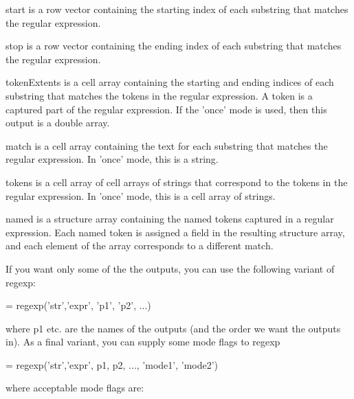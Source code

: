 \begin{DoxyItemize}
\item {\ttfamily start} is a row vector containing the starting index of each substring that matches the regular expression.  
\item {\ttfamily stop} is a row vector containing the ending index of each substring that matches the regular expression.  
\item {\ttfamily token\-Extents} is a cell array containing the starting and ending indices of each substring that matches the {\ttfamily tokens} in the regular expression. A token is a captured part of the regular expression. If the {\ttfamily 'once'} mode is used, then this output is a {\ttfamily double} array.  
\item {\ttfamily match} is a cell array containing the text for each substring that matches the regular expression. In {\ttfamily 'once'} mode, this is a string.  
\item {\ttfamily tokens} is a cell array of cell arrays of strings that correspond to the tokens in the regular expression. In {\ttfamily 'once'} mode, this is a cell array of strings.  
\item {\ttfamily named} is a structure array containing the named tokens captured in a regular expression. Each named token is assigned a field in the resulting structure array, and each element of the array corresponds to a different match.  
\end{DoxyItemize}If you want only some of the the outputs, you can use the following variant of {\ttfamily regexp}\-: \begin{DoxyVerb}  [o1 o2 ...] = regexp('str','expr', 'p1', 'p2', ...)
\end{DoxyVerb}
 where {\ttfamily p1} etc. are the names of the outputs (and the order we want the outputs in). As a final variant, you can supply some mode flags to {\ttfamily regexp} \begin{DoxyVerb}  [o1 o2 ...] = regexp('str','expr', p1, p2, ..., 'mode1', 'mode2')
\end{DoxyVerb}
 where acceptable {\ttfamily mode} flags are\-: 
